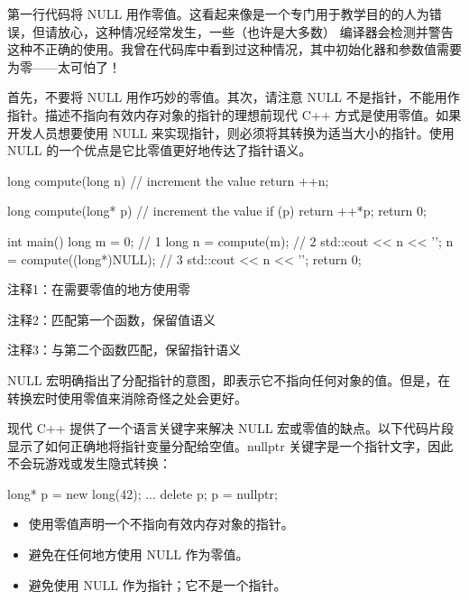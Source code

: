 第一行代码将 NULL 用作零值。这看起来像是一个专门用于教学目的的人为错误，但请放心，这种情况经常发生，一些（也许是大多数） 编译器会检测并警告这种不正确的使用。我曾在代码库中看到过这种情况，其中初始化器和参数值需要为零——太可怕了！


首先，不要将 NULL 用作巧妙的零值。其次，请注意 NULL 不是指针，不能用作指针。描述不指向有效内存对象的指针的理想前现代 C++ 方式是使用零值。如果开发人员想要使用 NULL 来实现指针，则必须将其转换为适当大小的指针。使用 NULL 的一个优点是它比零值更好地传达了指针语义。


\begin{cpp}
long compute(long n) { // increment the value
  return ++n;
}

long compute(long* p) { // increment the value
  if (p)
    return ++*p;
  return 0;
}

int main() {
  long m = 0; // 1
  long n = compute(m); // 2
  std::cout << n << '\n';
  n = compute((long*)NULL); // 3
  std::cout << n << '\n';
  return 0;
}
\end{cpp}

{\footnotesize
注释1：在需要零值的地方使用零

注释2：匹配第一个函数，保留值语义

注释3：与第二个函数匹配，保留指针语义
}

NULL 宏明确指出了分配指针的意图，即表示它不指向任何对象的值。但是，在转换宏时使用零值来消除奇怪之处会更好。

现代 C++ 提供了一个语言关键字来解决 NULL 宏或零值的缺点。以下代码片段显示了如何正确地将指针变量分配给空值。nullptr 关键字是一个指针文字，因此不会玩游戏或发生隐式转换：

\begin{cpp}
long* p = new long(42);
...
delete p;
p = nullptr;
\end{cpp}


\begin{itemize}
\item
使用零值声明一个不指向有效内存对象的指针。

\item
避免在任何地方使用 NULL 作为零值。

\item
避免使用 NULL 作为指针；它不是一个指针。
\end{itemize}












